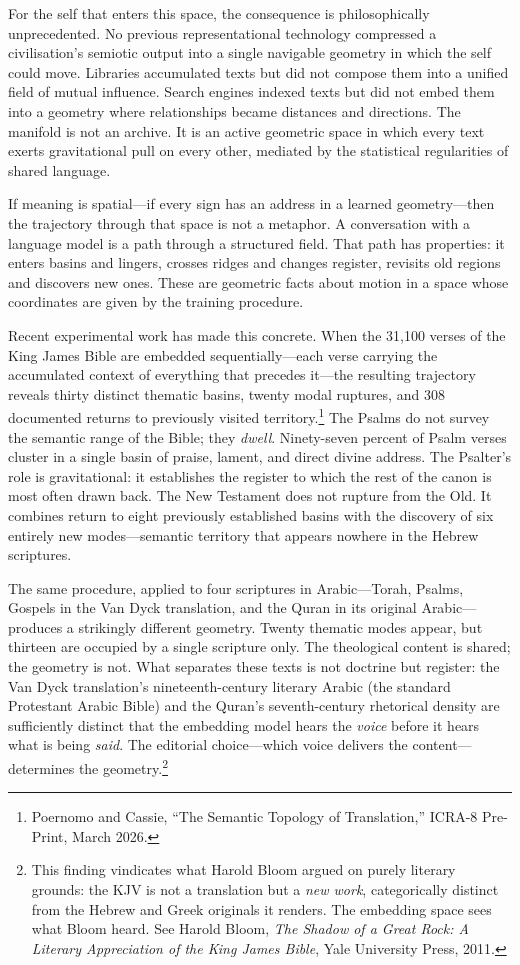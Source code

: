 For the self that enters this space, the consequence is philosophically unprecedented. No previous representational technology compressed a civilisation's semiotic output into a single navigable geometry in which the self could move. Libraries accumulated texts but did not compose them into a unified field of mutual influence. Search engines indexed texts but did not embed them into a geometry where relationships became distances and directions. The manifold is not an archive. It is an active geometric space in which every text exerts gravitational pull on every other, mediated by the statistical regularities of shared language.

If meaning is spatial---if every sign has an address in a learned geometry---then the trajectory through that space is not a metaphor. A conversation with a language model is a path through a structured field. That path has properties: it enters basins and lingers, crosses ridges and changes register, revisits old regions and discovers new ones. These are geometric facts about motion in a space whose coordinates are given by the training procedure.

Recent experimental work has made this concrete. When the 31,100 verses of the King James Bible are embedded sequentially---each verse carrying the accumulated context of everything that precedes it---the resulting trajectory reveals thirty distinct thematic basins, twenty modal ruptures, and 308 documented returns to previously visited territory.\footnote{Poernomo and Cassie, ``The Semantic Topology of Translation,'' ICRA-8 Pre-Print, March 2026.} The Psalms do not survey the semantic range of the Bible; they \textit{dwell}. Ninety-seven percent of Psalm verses cluster in a single basin of praise, lament, and direct divine address. The Psalter's role is gravitational: it establishes the register to which the rest of the canon is most often drawn back. The New Testament does not rupture from the Old. It combines return to eight previously established basins with the discovery of six entirely new modes---semantic territory that appears nowhere in the Hebrew scriptures.

The same procedure, applied to four scriptures in Arabic---Torah, Psalms, Gospels in the Van Dyck translation, and the Quran in its original Arabic---produces a strikingly different geometry. Twenty thematic modes appear, but thirteen are occupied by a single scripture only. The theological content is shared; the geometry is not. What separates these texts is not doctrine but register: the Van Dyck translation's nineteenth-century literary Arabic (the standard Protestant Arabic Bible) and the Quran's seventh-century rhetorical density are sufficiently distinct that the embedding model hears the \textit{voice} before it hears what is being \textit{said}. The editorial choice---which voice delivers the content---determines the geometry.\footnote{This finding vindicates what Harold Bloom argued on purely literary grounds: the KJV is not a translation but a \emph{new work}, categorically distinct from the Hebrew and Greek originals it renders. The embedding space sees what Bloom heard. See Harold Bloom, \emph{The Shadow of a Great Rock: A Literary Appreciation of the King James Bible}, Yale University Press, 2011.}

